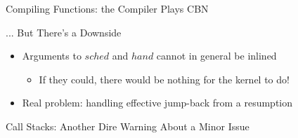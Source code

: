 \documentclass{beamer}
\newcommand{\forget}[1]{}
\begin{document}
\begin{frame}{Compiling Functions: the Compiler Plays CBN}
\begin{structure}{... But There's a Downside}
\begin{itemize}
\item{Arguments to $sched$ and $hand$ cannot in general be inlined}
\begin{itemize}\item{If they could, there would be nothing for the kernel to do!}\end{itemize}
\item{Real problem: handling effective jump-back from a resumption}
\end{itemize}


\end{structure}

\end{frame}



\begin{frame}{Call Stacks: Another Dire Warning About a Minor Issue}

\forget{
\begin{structure}{It's Not Just State!}

\begin{onlinebox}{11cm}

\begin{scriptsize}
\begin{flushleft}


\texttt{nextof :: R a $\rightarrow$ R (R a)}
\texttt{nextof r =}\\
\texttt{\ \ case r of}\\
\texttt{\ \ (Pause k) -> step\_R k}\\
\texttt{\ \ (Done v) -> step\_R r}\\
\ \\
\texttt{main =}\\
\texttt{\ \ loop ($\lambda$(r1, r2) ->}\\
\texttt{\ \ \ \ if (done r1) then break () else nextof r1 >>= $\lambda$r3 -> return (r2, r3))}\\

\end{flushleft}
\end{scriptsize}

\end{onlinebox}

\end{structure}

\begin{structure}{Something to Think About}
\begin{itemize}

\item{\texttt{leave} produces a new resumption by punctuating the actions of \texttt{r2} with the next action of \texttt{r1}}



\end{itemize}
\end{structure}}
\end{frame}
\end{document}
